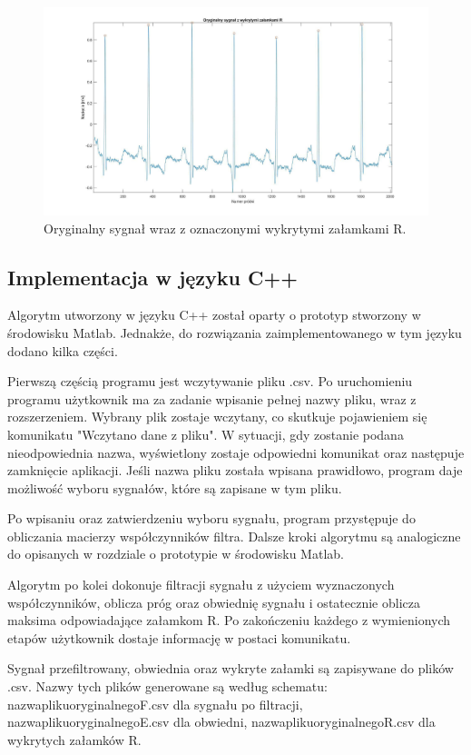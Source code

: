 \documentclass[10pt,a4paper]{article}
\begin{document}
\medskip
\begin{figure}[h]
\centering
\includegraphics[width=\textwidth]{QF2}
\caption{Oryginalny sygnał wraz z oznaczonymi wykrytymi załamkami R.}
\label{QF rys2}
\end{figure}

\newpage
\subsection{Implementacja w języku C++}
\bigskip

Algorytm utworzony w języku C++ został oparty o prototyp stworzony w środowisku Matlab. Jednakże, do rozwiązania zaimplementowanego w tym języku dodano kilka części.

Pierwszą częścią programu jest wczytywanie pliku .csv. Po uruchomieniu programu użytkownik ma za zadanie wpisanie pełnej nazwy pliku, wraz z rozszerzeniem. Wybrany plik zostaje wczytany, co skutkuje pojawieniem się komunikatu "Wczytano dane z pliku". W sytuacji, gdy zostanie podana nieodpowiednia nazwa, wyświetlony zostaje odpowiedni komunikat oraz następuje zamknięcie aplikacji. Jeśli nazwa pliku została wpisana prawidłowo, program daje możliwość wyboru sygnałów, które są zapisane w tym pliku. 

Po wpisaniu oraz zatwierdzeniu wyboru sygnału, program przystępuje do obliczania macierzy współczynników filtra. Dalsze kroki algorytmu są analogiczne do opisanych w rozdziale o prototypie w środowisku Matlab.

Algorytm po kolei dokonuje filtracji sygnału z użyciem wyznaczonych współczynników, oblicza próg oraz obwiednię sygnału i ostatecznie oblicza maksima odpowiadające załamkom R. Po zakończeniu każdego z wymienionych etapów użytkownik dostaje informację w postaci komunikatu. 

Sygnał przefiltrowany, obwiednia oraz wykryte załamki są zapisywane do plików .csv. Nazwy tych plików generowane są według schematu: nazwaplikuoryginalnegoF.csv dla sygnału po filtracji, nazwaplikuoryginalnegoE.csv dla obwiedni, nazwaplikuoryginalnegoR.csv dla wykrytych załamków R.
\end{document}
